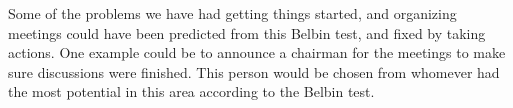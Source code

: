 Some of the problems we have had getting things started, and organizing meetings could have been predicted from this Belbin test, and fixed by taking actions. One example could be to announce a chairman for the meetings to make sure discussions were finished. This person would be chosen from whomever had the most potential in this area according to the Belbin test.


 


